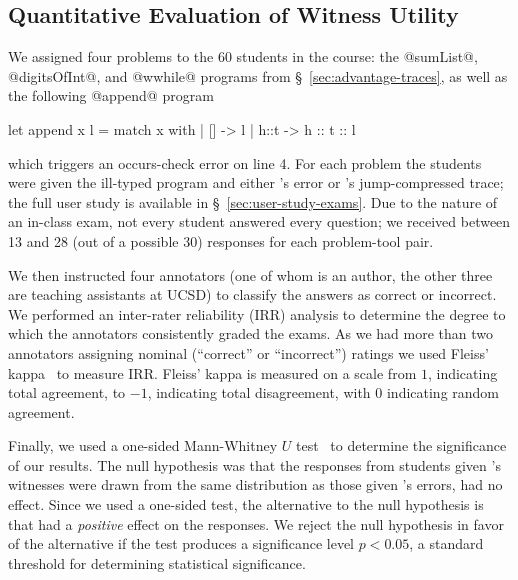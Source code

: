 \subsection{Quantitative Evaluation of Witness Utility}
\label{sec:user-study}
%
We assigned four problems to the 60 students in the course: the
@sumList@, \hbox{@digitsOfInt@,} and @wwhile@ programs from
\S~\ref{sec:advantage-traces}, as well as the following @append@ program
%
\begin{ecode}
  let append x l =
    match x with
    | []   -> l
    | h::t -> h :: t :: l
\end{ecode}
%
which triggers an occurs-check error on line 4.
%
For each problem the students were given the ill-typed program and
either \ocaml's error or \toolname's jump-compressed trace;
the full user study is available in \S~\ref{sec:user-study-exams}.
%
Due to the nature of an in-class exam, not every student answered every
question; we received between 13 and 28 (out of a possible 30) responses
for each problem-tool pair.

We then instructed four annotators (one of whom is an author, the other
three are teaching assistants at UCSD) to classify the answers as
correct or incorrect.
%
We performed an inter-rater reliability (IRR) analysis to determine the
degree to which the annotators consistently graded the exams.
%
As we had more than two annotators assigning nominal (``correct'' or
``incorrect'') ratings we used Fleiss' kappa~\cite{Fleiss1971-du} to
measure IRR.\@
%
Fleiss' kappa is measured on a scale from $1$, indicating total
agreement, to $-1$, indicating total disagreement, with $0$ indicating
random agreement.

Finally, we used a one-sided Mann-Whitney $U$ test~\cite{Mann1947-fd} to
determine the significance of our results.
%
The null hypothesis was that the responses from students given
\toolname's witnesses were drawn from the same distribution as those
given \ocaml's errors, \ie \toolname had no effect.
%
Since we used a one-sided test, the alternative to the null hypothesis
is that \toolname had a \emph{positive} effect on the responses.
%
We reject the null hypothesis in favor of the alternative if the test
produces a significance level $p < 0.05$, a standard threshold for
determining statistical significance.

